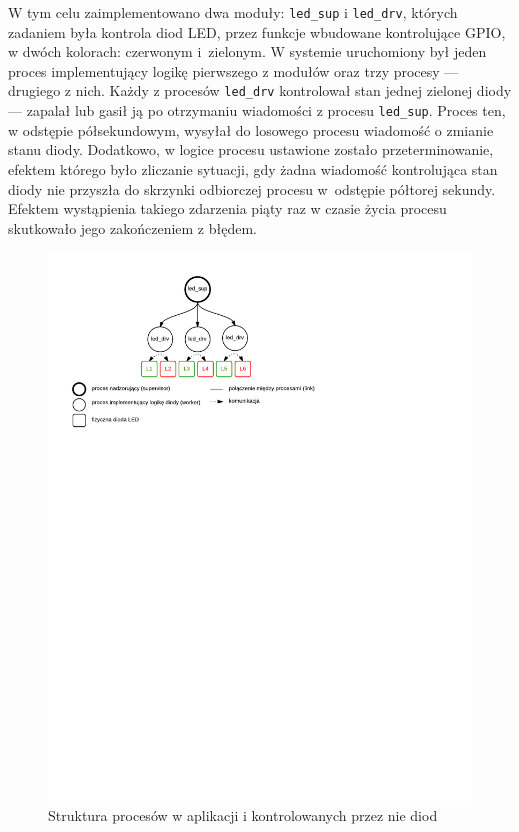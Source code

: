 W tym celu zaimplementowano dwa moduły: \texttt{led\_sup} i \texttt{led\_drv}, których zadaniem była kontrola diod LED, przez funkcje wbudowane kontrolujące GPIO, w dwóch kolorach: czerwonym i~zielonym.
W systemie uruchomiony był jeden proces implementujący logikę pierwszego z modułów oraz trzy procesy --- drugiego z nich.
Każdy z procesów \texttt{led\_drv} kontrolował stan jednej zielonej diody --- zapalał lub gasił ją po otrzymaniu wiadomości z procesu \texttt{led\_sup}. Proces ten, w odstępie półsekundowym, wysyłał do losowego procesu wiadomość o zmianie stanu diody. Dodatkowo, w logice procesu ustawione zostało przeterminowanie, efektem którego było zliczanie sytuacji, gdy żadna wiadomość kontrolująca stan diody nie przyszła do skrzynki odbiorczej procesu w~odstępie półtorej sekundy.
Efektem wystąpienia takiego zdarzenia piąty raz w czasie życia procesu skutkowało jego zakończeniem z błędem.

\begin{figure}[h]
\centerline{\includegraphics[scale=1, clip, trim=10mm 190mm 80mm 10mm]{example_led_processes}}
\caption{Struktura procesów w aplikacji i kontrolowanych przez nie diod}
\label{fig:exampleledprocesses}
\end{figure}

